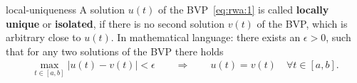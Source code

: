 \begin{Definition}{local-uniqueness}
   A solution $u(t)$ of the
  BVP~\eqref{eq:rwa:1} is called \textbf{locally unique}
   or
  \textbf{isolated}, if there is no second
  solution $v(t)$ of the BVP, which is arbitrary close to $u(t)$. In
  mathematical language: there exists an $\epsilon>0$, such that for
  any two solutions of the BVP there holds
  \begin{gather*}
    \max_{t\in [a,b]}|u(t)-v(t)| < \epsilon
    \qquad\Rightarrow\qquad
    u(t) = v(t) \quad \forall t\in [a,b].
  \end{gather*}
\end{Definition}
